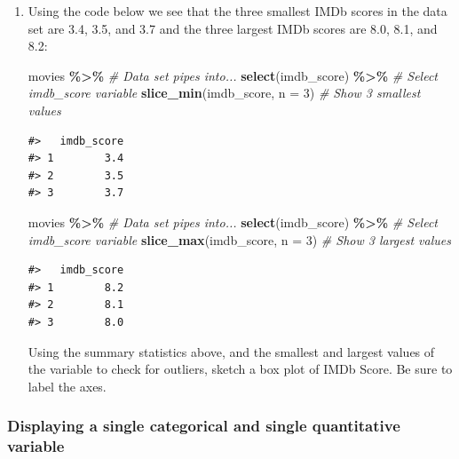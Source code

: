 \documentclass[
]{report}
\newenvironment{Shaded}{\begin{snugshade}}{\end{snugshade}}
\newcommand{\CommentTok}[1]{\textcolor[rgb]{0.56,0.35,0.01}{\textit{#1}}}
\newcommand{\DataTypeTok}[1]{\textcolor[rgb]{0.13,0.29,0.53}{#1}}
\newcommand{\DecValTok}[1]{\textcolor[rgb]{0.00,0.00,0.81}{#1}}
\newcommand{\KeywordTok}[1]{\textcolor[rgb]{0.13,0.29,0.53}{\textbf{#1}}}
\newcommand{\NormalTok}[1]{#1}
\newcommand{\OperatorTok}[1]{\textcolor[rgb]{0.81,0.36,0.00}{\textbf{#1}}}
\newcommand{\StringTok}[1]{\textcolor[rgb]{0.31,0.60,0.02}{#1}}
\begin{document}
\begin{enumerate}
\def\labelenumi{\arabic{enumi}.}
\setcounter{enumi}{11}
\item
  Using the code below we see that the three smallest IMDb scores in the data set are 3.4, 3.5, and 3.7 and the three largest IMDb scores are 8.0, 8.1, and 8.2:

\begin{Shaded}
\begin{Highlighting}[]
\NormalTok{movies }\OperatorTok{\%\textgreater{}\%}\StringTok{ }\CommentTok{\# Data set pipes into...}
\StringTok{  }\KeywordTok{select}\NormalTok{(imdb\_score) }\OperatorTok{\%\textgreater{}\%}\StringTok{ }\CommentTok{\# Select imdb\_score variable}
\StringTok{  }\KeywordTok{slice\_min}\NormalTok{(imdb\_score, }\DataTypeTok{n =} \DecValTok{3}\NormalTok{)  }\CommentTok{\# Show 3 smallest values}
\end{Highlighting}
\end{Shaded}

\begin{verbatim}
#>   imdb_score
#> 1        3.4
#> 2        3.5
#> 3        3.7
\end{verbatim}

\begin{Shaded}
\begin{Highlighting}[]
\NormalTok{movies }\OperatorTok{\%\textgreater{}\%}\StringTok{ }\CommentTok{\# Data set pipes into...}
\StringTok{  }\KeywordTok{select}\NormalTok{(imdb\_score) }\OperatorTok{\%\textgreater{}\%}\StringTok{ }\CommentTok{\# Select imdb\_score variable}
\StringTok{  }\KeywordTok{slice\_max}\NormalTok{(imdb\_score, }\DataTypeTok{n =} \DecValTok{3}\NormalTok{)  }\CommentTok{\# Show 3 largest values}
\end{Highlighting}
\end{Shaded}

\begin{verbatim}
#>   imdb_score
#> 1        8.2
#> 2        8.1
#> 3        8.0
\end{verbatim}

  Using the summary statistics above, and the smallest and largest values of the variable to check for outliers, sketch a box plot of IMDb Score. Be sure to label the axes.
\end{enumerate}

\vspace{1.5in}

\hypertarget{displaying-a-single-categorical-and-single-quantitative-variable}{%
\subsubsection*{Displaying a single categorical and single quantitative variable}\label{displaying-a-single-categorical-and-single-quantitative-variable}}
\end{document}
